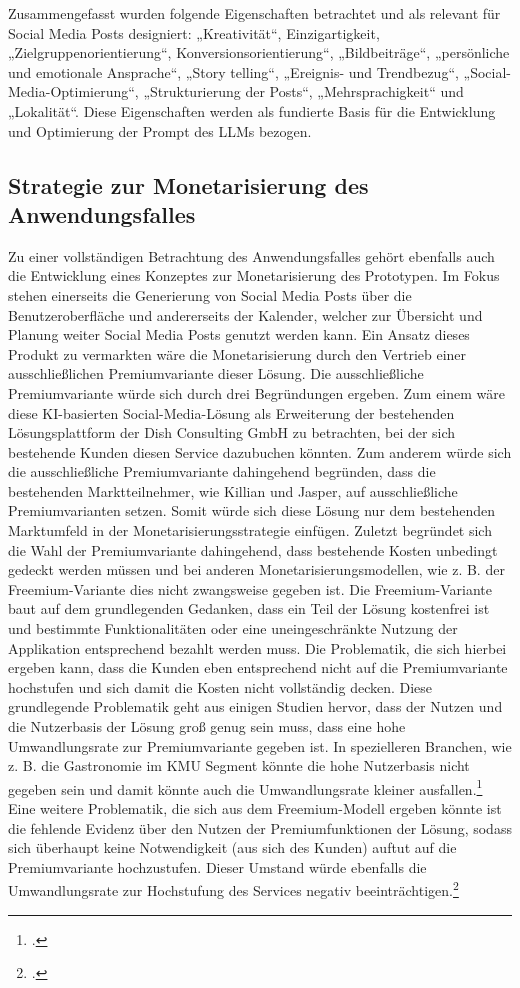 Zusammengefasst wurden folgende Eigenschaften betrachtet und als relevant für Social Media Posts designiert: „Kreativität“, Einzigartigkeit, „Zielgruppenorientierung“, Konversionsorientierung“, „Bildbeiträge“, „persönliche und emotionale Ansprache“, „Story telling“, „Ereignis- und Trendbezug“, „Social-Media-Optimierung“, „Strukturierung der Posts“, „Mehrsprachigkeit“ und „Lokalität“.
Diese Eigenschaften werden als fundierte Basis für die Entwicklung und Optimierung der Prompt des LLMs bezogen.

\subsection{Strategie zur Monetarisierung des Anwendungsfalles}
Zu einer vollständigen Betrachtung des Anwendungsfalles gehört ebenfalls auch die Entwicklung eines Konzeptes zur Monetarisierung des Prototypen.
Im Fokus stehen einerseits die Generierung von Social Media Posts über die Benutzeroberfläche und andererseits der Kalender, welcher zur Übersicht und Planung weiter Social Media Posts genutzt werden kann.
Ein Ansatz dieses Produkt zu vermarkten wäre die Monetarisierung durch den Vertrieb einer ausschließlichen Premiumvariante dieser Lösung.
Die ausschließliche Premiumvariante würde sich durch drei Begründungen ergeben.
Zum einem wäre diese KI-basierten Social-Media-Lösung als Erweiterung der bestehenden Lösungsplattform der Dish Consulting GmbH zu betrachten, bei der sich bestehende Kunden diesen Service dazubuchen könnten.
Zum anderem würde sich die ausschließliche Premiumvariante dahingehend begründen, dass die bestehenden Marktteilnehmer, wie Killian und Jasper, auf ausschließliche Premiumvarianten setzen.
Somit würde sich diese Lösung nur dem bestehenden Marktumfeld in der Monetarisierungsstrategie einfügen.
Zuletzt begründet sich die Wahl der Premiumvariante dahingehend, dass bestehende Kosten unbedingt gedeckt werden müssen und bei anderen Monetarisierungsmodellen, wie z. B. der Freemium-Variante dies nicht zwangsweise gegeben ist.
Die Freemium-Variante baut auf dem grundlegenden Gedanken, dass ein Teil der Lösung kostenfrei ist und bestimmte Funktionalitäten oder eine uneingeschränkte Nutzung der Applikation entsprechend bezahlt werden muss.
Die Problematik, die sich hierbei ergeben kann, dass die Kunden eben entsprechend nicht auf die Premiumvariante hochstufen und sich damit die Kosten nicht vollständig decken.
Diese grundlegende Problematik geht aus einigen Studien hervor, dass der Nutzen und die Nutzerbasis der Lösung groß genug sein muss, dass eine hohe Umwandlungsrate zur Premiumvariante gegeben ist.
In spezielleren Branchen, wie z. B. die Gastronomie im \ac{KMU} Segment könnte die hohe Nutzerbasis nicht gegeben sein und damit könnte auch die Umwandlungsrate kleiner ausfallen.\footcite{kumar2014freemium}
Eine weitere Problematik, die sich aus dem Freemium-Modell ergeben könnte ist die fehlende Evidenz über den Nutzen der Premiumfunktionen der Lösung, sodass sich überhaupt keine Notwendigkeit (aus sich des Kunden) auftut auf die Premiumvariante hochzustufen.
Dieser Umstand würde ebenfalls die Umwandlungsrate zur Hochstufung des Services negativ beeinträchtigen.\footcite{kim2018perceived}


